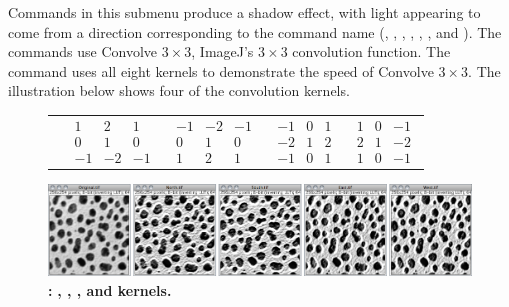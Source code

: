 Commands in this submenu produce a shadow effect, with light appearing
to come from a direction corresponding to the command name (,
, , ,
, , 
and ). The commands use Convolve $3\times3$,
ImageJ's $3\times3$ convolution function. The 
command uses all eight kernels to demonstrate the speed of Convolve
$3\times3$. The illustration below shows four of the 
convolution kernels. 
\begin{figure}[H]
\noindent \setlength{\tabcolsep}{0pt}%
\begin{tabular}{>{\centering}m{}>{\centering}m{}>{\centering}m{}>{\centering}m{}>{\centering}m{}}
\noindent \centering{}{\scriptsize Original} & {\tiny $\begin{array}{rrr}
1 & 2 & 1\\
0 & 1 & 0\\
-1 & -2 & -1
\end{array}$} & {\tiny $\begin{array}{rrr}
-1 & -2 & -1\\
0 & 1 & 0\\
1 & 2 & 1
\end{array}$} & {\tiny $\begin{array}{rrr}
-1 & 0 & 1\\
-2 & 1 & 2\\
-1 & 0 & 1
\end{array}$} & {\tiny $\begin{array}{rrr}
1 & 0 & -1\\
2 & 1 & -2\\
1 & 0 & -1
\end{array}$}\tabularnewline
\end{tabular}

\noindent \includegraphics[width=1\columnwidth]{images/ShadowsDemo}\caption{\textbf{\protect{}:}\textbf{\emph{
}}\textbf{\protect{}, \protect{},
\protect{}, and \protect{}
kernels.}}
\end{figure}



